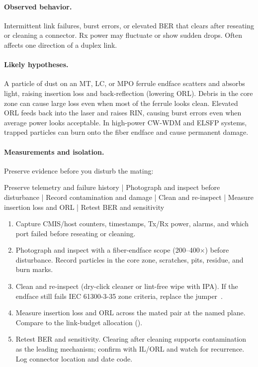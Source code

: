 \paragraph{Observed behavior.}
Intermittent link failures, burst errors, or elevated BER that clears after
reseating or cleaning a connector. Rx power may fluctuate or show sudden drops.
Often affects one direction of a duplex link.

\paragraph{Likely hypotheses.}
A particle of dust on an MT, LC, or MPO ferrule endface scatters and absorbs
light, raising insertion loss and back-reflection (lowering ORL). Debris in the
core zone can cause large loss even when most of the ferrule looks clean.
Elevated ORL feeds back into the laser and raises RIN, causing burst errors
even when average power looks acceptable. In high-power CW-WDM and ELSFP systems,
trapped particles can burn onto the fiber endface and cause permanent damage.

\paragraph{Measurements and isolation.}
Preserve evidence before you disturb the mating:
\begin{dectree}
Preserve telemetry and failure history
  |
Photograph and inspect before disturbance
  |
Record contamination and damage
  |
Clean and re-inspect
  |
Measure insertion loss and ORL
  |
Retest BER and sensitivity
\end{dectree}
\begin{enumerate}
\item Capture CMIS/host counters, timestamps, Tx/Rx power, alarms, and which
      port failed before reseating or cleaning.
\item Photograph and inspect with a fiber-endface scope (200--400$\times$) before
      disturbance. Record particles in the core zone, scratches, pits, residue, and
      burn marks.
\item Clean and re-inspect (dry-click cleaner or lint-free wipe with IPA). If the
      endface still fails IEC 61300-3-35 zone criteria, replace the
      jumper~\cite{iec61300}.
\item Measure insertion loss and ORL across the mated pair at the named plane.
      Compare to the link-budget allocation ().
\item Retest BER and sensitivity. Clearing after cleaning supports contamination as
      the leading mechanism; confirm with IL/ORL and watch for recurrence. Log
      connector location and date code.
\end{enumerate}

